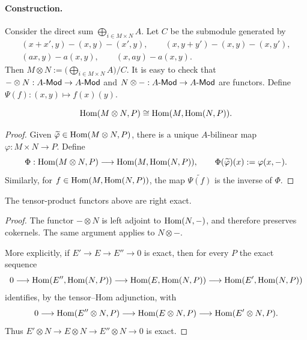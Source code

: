\documentclass[11pt,a4paper]{article}
\begin{document}
\paragraph{Construction.}
Consider the direct sum $\bigoplus_{i\in M\times N}A$. Let $C$ be the submodule generated by
\[
\begin{gathered}
(x+x',y)-(x,y)-(x',y),\qquad (x,y+y')-(x,y)-(x,y'),\\
(ax,y)-a(x,y),\qquad(x,ay)-a(x,y).
\end{gathered}
\]
Then $M\otimes N:=\bigl(\bigoplus_{i\in M\times N}A\bigr)/C$.
It is easy to check that $-\otimes N:A\text{-}\mathsf{Mod}\to A\text{-}\mathsf{Mod}$ and $N\otimes-:A\text{-}\mathsf{Mod}\to A\text{-}\mathsf{Mod}$ are functors. Define $\Psi(f):(x,y)\mapsto f(x)(y)$.
\begin{claim}
\[\operatorname{Hom}(M\otimes N,P)\cong\operatorname{Hom}(M,\operatorname{Hom}(N,P)).\]
\end{claim}
\begin{proof}
Given $\widetilde\varphi\in\operatorname{Hom}(M\otimes N,P)$, there is a unique $A$-bilinear map $\varphi:M\times N\to P$. Define
\[
\Phi:\operatorname{Hom}(M\otimes N,P)\longrightarrow\operatorname{Hom}(M,\operatorname{Hom}(N,P)),
\qquad \Phi(\widetilde\varphi)(x):=\varphi(x,-).
\]
Similarly, for $f\in\operatorname{Hom}(M,\operatorname{Hom}(N,P))$, the map $\widetilde{\Psi(f)}$ is the inverse of $\Phi$.
\end{proof}
\begin{claim}
The tensor-product functors above are right exact.
\end{claim}
\begin{proof}
The functor $-\otimes N$ is left adjoint to $\operatorname{Hom}(N,-)$, and therefore preserves cokernels. The same argument applies to $N\otimes-$.

More explicitly, if $E'\to E\to E''\to0$ is exact, then for every $P$ the exact sequence
\[
0\longrightarrow\operatorname{Hom}(E'',\operatorname{Hom}(N,P))
\longrightarrow\operatorname{Hom}(E,\operatorname{Hom}(N,P))
\longrightarrow\operatorname{Hom}(E',\operatorname{Hom}(N,P))
\]
identifies, by the tensor--Hom adjunction, with
\[
0\longrightarrow\operatorname{Hom}(E''\otimes N,P)
\longrightarrow\operatorname{Hom}(E\otimes N,P)
\longrightarrow\operatorname{Hom}(E'\otimes N,P).
\]
Thus $E'\otimes N\to E\otimes N\to E''\otimes N\to0$ is exact.
\end{proof}
\end{document}
